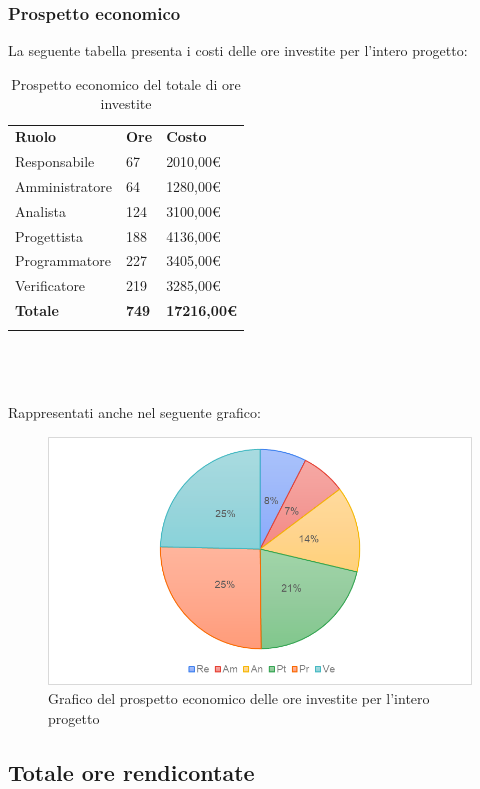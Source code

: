 \subsubsection{Prospetto economico}
La seguente tabella presenta i costi delle ore investite per l'intero progetto\glo:
\begin{longtable} {
		>{}p{32mm}
		>{}p{20mm}
		>{}p{20mm}
	}
	\rowcolor{gray!50}
	
	\textbf{Ruolo} & \textbf{Ore} & \textbf{Costo} \TBstrut \\
	Responsabile & 67 & 2010,00\euro{} \TBstrut \\
	Amministratore & 64 & 1280,00\euro{} \TBstrut \\
	Analista & 124 & 3100,00\euro{} \TBstrut \\
	Progettista & 188 & 4136,00\euro{} \TBstrut \\
	Programmatore & 227 & 3405,00\euro{} \TBstrut \\
	Verificatore & 219 & 3285,00\euro{} \TBstrut \\
	\textbf{Totale} & \textbf{749}& \textbf{17216,00\euro{}} \TBstrut \\		
	\rowcolor{white}
	\caption{Prospetto economico del totale di ore investite}
\end{longtable} \mbox{} \\ \\ \\
Rappresentati anche nel seguente grafico:
\begin{figure} [H]
	\includegraphics[width=\linewidth]{./img/Grafici/10.png}
	\caption{Grafico del prospetto economico delle ore investite per l'intero progetto\glo}
\end{figure}

\subsection{Totale ore rendicontate}

